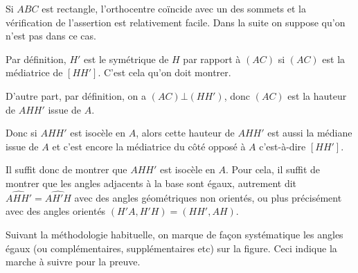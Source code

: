 \begin{exo}
\begin{sol}
Si $ABC$ est rectangle, l'orthocentre coïncide avec un des sommets et la vérification de l'assertion est relativement facile. Dans la suite on suppose qu'on n'est pas dans ce cas.

Par définition, $H'$ est le symétrique de $H$ par rapport à $(AC)$ si $(AC)$ est la médiatrice de $[HH']$. C'est cela qu'on doit montrer.



D'autre part, par définition, on a $(AC) \bot (HH')$, donc $(AC)$ est la hauteur de $AHH'$ issue de $A$. 

Donc si $AHH'$ est isocèle en $A$, alors cette hauteur de $AHH'$  est aussi la médiane issue de $A$ et c'est encore la médiatrice du côté opposé à $A$ c'est-à-dire $[HH']$.

Il suffit donc de montrer que $AHH'$ est isocèle en $A$. Pour cela, il suffit de montrer que les angles adjacents à la base sont égaux, autrement dit $\widehat{AHH'} = \widehat{AH'H}$ avec des angles géométriques non orientés, ou plus précisément avec des angles orientés $(H'A,H'H)=(HH',AH)$.

Suivant la méthodologie habituelle, on marque de façon systématique les angles égaux (ou complémentaires, supplémentaires etc) sur la figure. Ceci indique la marche à suivre pour la preuve.



\end{sol}
\end{exo}
